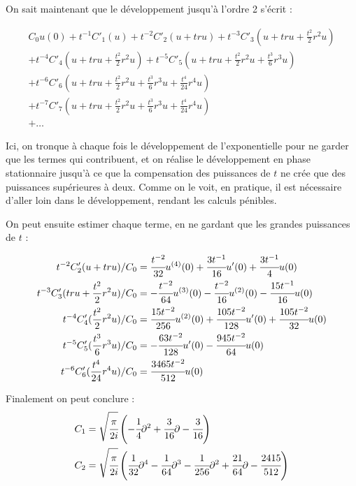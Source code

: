 On sait maintenant que le développement jusqu'à l'ordre 2 s'écrit :

\begin{multline*}
	C_0u(0) + t^{-1}C'_1(u) + t^{-2}C'_2(u + tru) + t^{-3}C'_3(u + tru + \frac{t^2}{2}r^2u) \\+ t^{-4}C'_4(u + tru + \frac{t^2}{2}r^2u) + t^{-5}C'_5(u + tru + \frac{t^2}{2}r^2u + \frac{t^3}{6}r^3u) \\+ t^{-6}C'_6(u + tru + \frac{t^2}{2}r^2u + \frac{t^3}{6}r^3u + \frac{t^4}{24}r^4u) \\+ t^{-7}C'_7(u + tru + \frac{t^2}{2}r^2u + \frac{t^3}{6}r^3u + \frac{t^4}{24}r^4u) \\+ \ldots
\end{multline*}

Ici, on tronque à chaque fois le développement de l'exponentielle pour ne garder que les termes qui contribuent, et on réalise le développement en phase stationnaire jusqu'à ce que la compensation des puissances de $t$ ne crée que des puissances supérieures à deux. Comme on le voit, en pratique, il est nécessaire d'aller loin dans le développement, rendant les calculs pénibles.

On peut ensuite estimer chaque terme, en ne gardant que les grandes puissances de $t$ :

\begin{align*}
	t^{-2}C'_2(u + tru)/C_0 &= \cfrac{t^{-2}}{32}u^{(4)}(0) + \cfrac{3t^{-1}}{16}u'(0) + \cfrac{3t^{-1}}{4}u(0)\\
	t^{-3}C'_3(tru + \frac{t^2}{2}r^2u)/C_0 &= -\cfrac{t^{-2}}{64}u^{(3)}(0) - \cfrac{t^{-2}}{16}u^{(2)}(0) - \cfrac{15t^{-1}}{16}u(0)\\
	t^{-4}C'_4(\frac{t^2}{2}r^2u)/C_0 &= \cfrac{15t^{-2}}{256}u^{(2)}(0) + \cfrac{105t^{-2}}{128}u'(0) + \cfrac{105t^{-2}}{32}u(0)\\
	t^{-5}C'_5(\frac{t^3}{6}r^3u)/C_0 &= -\cfrac{63t^{-2}}{128}u'(0) - \cfrac{945t^{-2}}{64}u(0)\\
	t^{-6}C'_6(\frac{t^4}{24}r^4u)/C_0  &= \cfrac{3465t^{-2}}{512}u(0)
\end{align*}

Finalement on peut conclure :
\begin{align*}
	C_1 &= \sqrt{\cfrac{\pi}{2i}}\left(-\cfrac{1}{4}\partial^2 + \cfrac{3}{16}\partial - \cfrac{3}{16}\right)\\
	C_2 &= \sqrt{\cfrac{\pi}{2i}}\left(\cfrac{1}{32}\partial^4 - \cfrac{1}{64}\partial^3 - \cfrac{1}{256}\partial^2 + \cfrac{21}{64}\partial - \cfrac{2415}{512}\right)
\end{align*}
